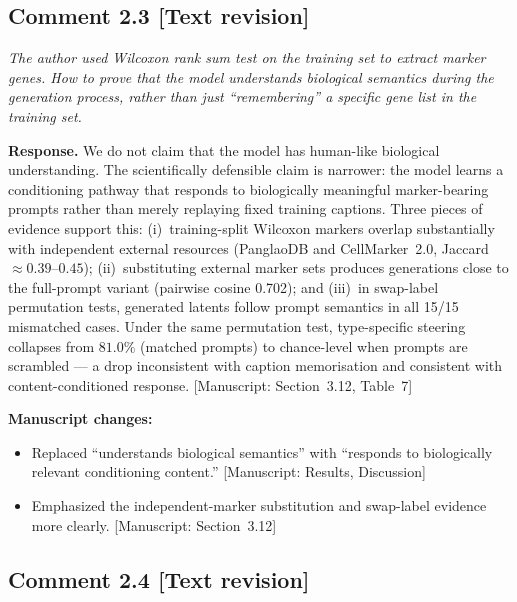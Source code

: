 \documentclass[11pt,letterpaper]{article}
\newcommand{\statustext}{\textcolor{statusblue}{\textbf{[Text revision]}}}
\newcommand{\msref}[1]{\textcolor{blue!60!black}{\textsf{[Manuscript: #1]}}}
\begin{document}
\medskip

\subsection*{Comment 2.3 \hfill \statustext}

\begin{reviewercomment}
\itshape
The author used Wilcoxon rank sum test on the training set to extract marker genes. How to prove that the model understands biological semantics during the generation process, rather than just ``remembering'' a specific gene list in the training set.
\end{reviewercomment}

\noindent\textbf{Response.}
We do not claim that the model has human-like biological understanding. The scientifically defensible claim is narrower: the model learns a conditioning pathway that responds to biologically meaningful marker-bearing prompts rather than merely replaying fixed training captions. Three pieces of evidence support this: (i)~training-split Wilcoxon markers overlap substantially with independent external resources (PanglaoDB and CellMarker~2.0, Jaccard $\approx 0.39$--$0.45$); (ii)~substituting external marker sets produces generations close to the full-prompt variant (pairwise cosine 0.702); and (iii)~in swap-label permutation tests, generated latents follow prompt semantics in all 15/15 mismatched cases. Under the same permutation test, type-specific steering collapses from $81.0\%$ (matched prompts) to chance-level when prompts are scrambled --- a drop inconsistent with caption memorisation and consistent with content-conditioned response. \msref{Section~3.12, Table~7}

\noindent\textbf{Manuscript changes:}
\begin{itemize}
  \item Replaced ``understands biological semantics'' with ``responds to biologically relevant conditioning content.'' \msref{Results, Discussion}
  \item Emphasized the independent-marker substitution and swap-label evidence more clearly. \msref{Section~3.12}
\end{itemize}

\medskip

\subsection*{Comment 2.4 \hfill \statustext}
\end{document}
